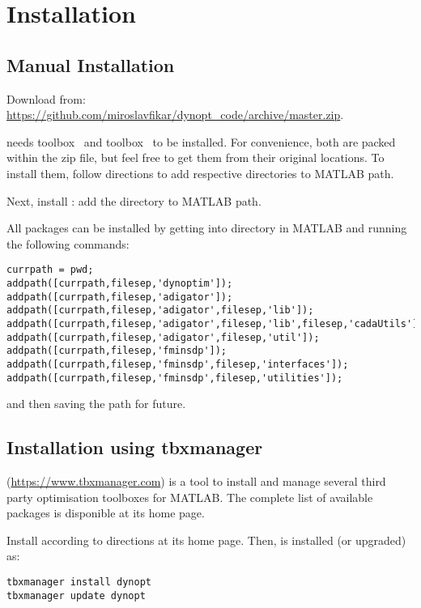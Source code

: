 \section{Installation}
\label{sec:instdynopt}

\subsection{Manual Installation}
Download  from:\\
\url{https://github.com/miroslavfikar/dynopt_code/archive/master.zip}. 

 needs  toolbox~\citep{fminsdp} and
 toolbox~\citep{wei17} to be installed. For convenience,
both are packed within the zip file, but feel free to get them
from their original locations. To install them, follow directions to add
respective directories to MATLAB path.

Next, install : add the directory  to
MATLAB path. 

All packages can be installed by getting into 
directory in MATLAB and running the following commands:
\begin{verbatim}
currpath = pwd;
addpath([currpath,filesep,'dynoptim']);
addpath([currpath,filesep,'adigator']);
addpath([currpath,filesep,'adigator',filesep,'lib']);
addpath([currpath,filesep,'adigator',filesep,'lib',filesep,'cadaUtils']);
addpath([currpath,filesep,'adigator',filesep,'util']);
addpath([currpath,filesep,'fminsdp']);
addpath([currpath,filesep,'fminsdp',filesep,'interfaces']);
addpath([currpath,filesep,'fminsdp',filesep,'utilities']);
\end{verbatim}
and then saving the path for future.

\subsection{Installation using tbxmanager}
 (\url{https://www.tbxmanager.com}) is a tool to
install and manage several third party optimisation toolboxes for
MATLAB.  The complete list of available packages is disponible at its
home page.

Install  according to directions at its home
page. Then,  is installed (or upgraded) as:
\begin{verbatim}
tbxmanager install dynopt
tbxmanager update dynopt
\end{verbatim}

